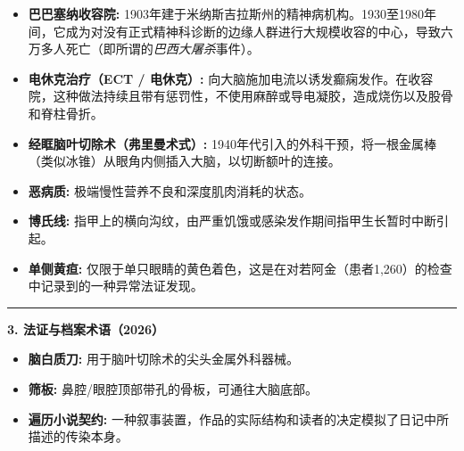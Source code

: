 \vspace{0.4em}
\begin{itemize}[itemsep=0.2em]
  \item \textbf{巴巴塞纳收容院:} 1903年建于米纳斯吉拉斯州的精神病机构。1930至1980年间，它成为对没有正式精神科诊断的边缘人群进行大规模收容的中心，导致六万多人死亡（即所谓的\textit{巴西大屠杀}事件）。
  \item \textbf{电休克治疗（ECT / 电休克）:} 向大脑施加电流以诱发癫痫发作。在收容院，这种做法持续且带有惩罚性，不使用麻醉或导电凝胶，造成烧伤以及股骨和脊柱骨折。
  \item \textbf{经眶脑叶切除术（弗里曼术式）:} 1940年代引入的外科干预，将一根金属棒（类似冰锥）从眼角内侧插入大脑，以切断额叶的连接。
  \item \textbf{恶病质:} 极端慢性营养不良和深度肌肉消耗的状态。
  \item \textbf{博氏线:} 指甲上的横向沟纹，由严重饥饿或感染发作期间指甲生长暂时中断引起。
  \item \textbf{单侧黄疸:} 仅限于单只眼睛的黄色着色，这是在对若阿金（患者1,260）的检查中记录到的一种异常法证发现。
\end{itemize}

\vspace{0.8em}
\noindent\rule{\textwidth}{0.5pt}
\vspace{0.6em}

\noindent\textbf{3. 法证与档案术语（2026）}

\vspace{0.4em}
\begin{itemize}[itemsep=0.2em]
  \item \textbf{脑白质刀:} 用于脑叶切除术的尖头金属外科器械。
  \item \textbf{筛板:} 鼻腔/眼腔顶部带孔的骨板，可通往大脑底部。
  \item \textbf{遍历小说契约:} 一种叙事装置，作品的实际结构和读者的决定模拟了日记中所描述的传染本身。
\end{itemize}

\endgroup
\clearpage
